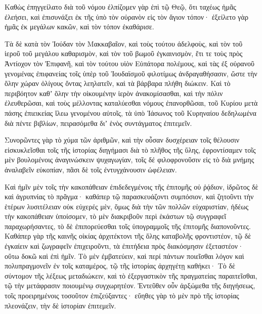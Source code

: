 {Καθὼς ἐπηγγείλατο διὰ τοῦ νόμου ἐλπίζομεν γὰρ ἐπὶ τῷ Θεῷ, ὅτι ταχέως ἡμᾶς ἐλεήσει, καὶ ἐπισυνάξει ἐκ τῆς ὑπὸ τὸν οὐρανὸν εἰς τὸν ἅγιον τόπον· ἐξείλετο γὰρ ἡμᾶς ἐκ μεγάλων κακῶν, καὶ τὸν τόπον ἐκαθάρισε.
\par }{\PP {}Τὰ δὲ κατὰ τὸν Ἰούδαν τὸν Μακκαβαῖον, καὶ τοὺς τούτου ἀδελφοὺς, καὶ τὸν τοῦ ἱεροῦ τοῦ μεγάλου καθαρισμὸν, καὶ τὸν τοῦ βωμοῦ ἐγκαινισμὸν,
ἔτι τε τοὺς πρὸς Ἀντίοχον τὸν Ἐπιφανῆ, καὶ τὸν τούτου υἱὸν Εὐπάτορα πολέμους,
καὶ τὰς ἐξ οὐρανοῦ γενομένας ἐπιφανείας τοῖς ὑπὲρ τοῦ Ἰουδαϊσμοῦ φιλοτίμως ἀνδραγαθήσασιν, ὥστε τὴν ὅλην χώραν ὀλίγους ὄντας λεηλατεῖν, καὶ τὰ βάρβαρα πλήθη διώκειν.
Καὶ τὸ περιβόητον καθʼ ὅλην τὴν οἰκουμένην ἱερὸν ἀνακομίσασθαι, καὶ τὴν πόλιν ἐλευθερῶσαι, καὶ τοὺς μέλλοντας καταλύεσθαι νόμους ἐπανορθῶσαι, τοῦ Κυρίου μετὰ πάσης ἐπιεικείας ἵλεω γενομένου αὐτοῖς,
τὰ ὑπὸ Ἰάσωνος τοῦ Κυρηναίου δεδηλωμένα διὰ πέντε βιβλίων, πειρασόμεθα διʼ ἑνὸς συντάγματος ἐπιτεμεῖν.
\par }{\PP {}Συνορῶντες γὰρ τὸ χύμα τῶν ἀριθμῶν, καὶ τὴν οὖσαν δυσχέρειαν τοῖς θέλουσιν εἰσκυκλεῖσθαι τοῖς τῆς ἱστορίας διηγήμασι διὰ τὸ πλῆθος τῆς ὕλης,
ἐφροντίσαμεν τοῖς μὲν βουλομένοις ἀναγινώσκειν ψυχαγωγίαν, τοῖς δέ φιλοφρονοῦσιν εἰς τὸ διὰ μνήμης ἀναλαβεῖν εὐκοπίαν, πᾶσι δὲ τοῖς ἐντυγχάνουσιν ὠφέλειαν.
\par }{\PP {}Καὶ ἡμῖν μὲν τοῖς τὴν κακοπάθειαν ἐπιδεδεγμένοις τῆς ἐπιτομῆς οὐ ῥᾴδιον, ἱδρῶτος δὲ καὶ ἀγρυπνίας τὸ πρᾶγμα·
καθάπερ τῷ παρασκευάζοντι συμπόσιον, καὶ ζητοῦντι τὴν ἑτέρων λυσιτέλειαν οὐκ εὐχερές μὲν, ὅμως διὰ τὴν τῶν πολλῶν εὐχαριστίαν, ἡδέως τὴν κακοπάθειαν ὑποίσομεν,
τὸ μὲν διακριβοῦν περὶ ἑκάστων τῷ συγγραφεῖ παραχωρήσαντες, τὸ δὲ ἐπιπορεύεσθαι τοῖς ὑπογραμμοῖς τῆς ἐπιτομῆς διαπονοῦντες.
Καθάπερ γὰρ τῆς καινῆς οἰκίας ἀρχιτέκτονι τῆς ὅλης καταβολῆς φροντιστέον, τῷ δὲ ἐγκαίειν καὶ ζωγραφεῖν ἐπιχειροῦντι, τὰ ἐπιτήδεια πρὸς διακόσμησιν ἐξεταστέον· οὕτω δοκῶ καὶ ἐπὶ ἡμῖν.
Τὸ μὲν ἐμβατεύειν, καὶ περί πάντων ποιεῖσθαι λόγον καὶ πολυπραγμονεῖν ἐν τοῖς καταμέρος, τῷ τῆς ἱστορίας ἀρχηγέτῃ καθήκει·
Τὸ δὲ σύντομον τῆς λέξεως μεταδιώκειν, καὶ τὸ ἐξεργαστικὸν τῆς πραγματείας παραιτεῖσθαι, τῷ τὴν μετάφρασιν ποιουμένῳ συγχωρητέον.
Ἐντεῦθεν οὖν ἀρξώμεθα τῆς διηγήσεως, τοῖς προειρημένοις τοσοῦτον ἐπιζεύξαντες· εὔηθες γὰρ τὸ μὲν πρὸ τῆς ἱστορίας πλεονάζειν, τὴν δὲ ἱστορίαν ἐπιτεμεῖν.

}
